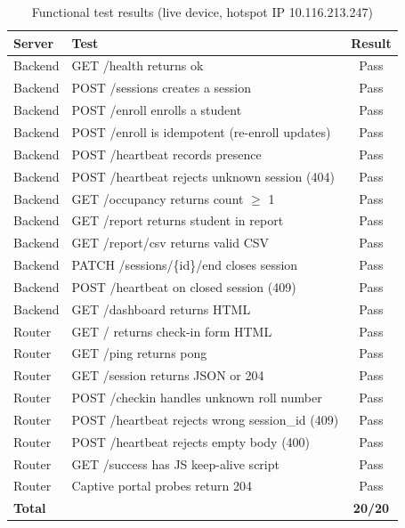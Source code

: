 \documentclass[sigconf,nonacm]{acmart}
\begin{document}
\begin{table}[h]
\caption{Functional test results (live device, hotspot IP
  10.116.213.247)}
\label{tab:tests}
\begin{tabular}{llc}
\toprule
Server & Test & Result \\
\midrule
Backend & GET /health returns ok                          & Pass \\
Backend & POST /sessions creates a session                & Pass \\
Backend & POST /enroll enrolls a student                  & Pass \\
Backend & POST /enroll is idempotent (re-enroll updates)  & Pass \\
Backend & POST /heartbeat records presence                & Pass \\
Backend & POST /heartbeat rejects unknown session (404)   & Pass \\
Backend & GET /occupancy returns count $\geq$ 1           & Pass \\
Backend & GET /report returns student in report           & Pass \\
Backend & GET /report/csv returns valid CSV               & Pass \\
Backend & PATCH /sessions/\{id\}/end closes session       & Pass \\
Backend & POST /heartbeat on closed session (409)         & Pass \\
Backend & GET /dashboard returns HTML                     & Pass \\
\midrule
Router  & GET / returns check-in form HTML                & Pass \\
Router  & GET /ping returns pong                          & Pass \\
Router  & GET /session returns JSON or 204                & Pass \\
Router  & POST /checkin handles unknown roll number       & Pass \\
Router  & POST /heartbeat rejects wrong session\_id (409) & Pass \\
Router  & POST /heartbeat rejects empty body (400)        & Pass \\
Router  & GET /success has JS keep-alive script           & Pass \\
Router  & Captive portal probes return 204                & Pass \\
\midrule
\multicolumn{2}{l}{\textbf{Total}} & \textbf{20/20} \\
\bottomrule
\end{tabular}
\end{table}
\end{document}
